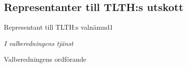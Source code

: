 \documentclass[10pt]{article}
\begin{document}
    \subsection{Representanter till TLTH:s utskott}
    \begin{vallista}
        \begin{post}{Representant till TLTH:s valnämnd}{1}
        \end{post}
    \end{vallista}
    \begin{signatures}{1}
        \emph{I valberedningens tjänst}
        \signature{Pontus Landgren}{Valberedningens ordförande}
    \end{signatures}
    
    
\end{document}
